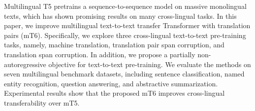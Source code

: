 Multilingual T5 pretrains a sequence-to-sequence model on massive monolingual texts, which has shown promising results on many cross-lingual tasks. In this paper, we improve multilingual text-to-text transfer Transformer with translation pairs (mT6). Specifically, we explore three cross-lingual text-to-text pre-training tasks, namely, machine translation, translation pair span corruption, and translation span corruption. In addition, we propose a partially non-autoregressive objective for text-to-text pre-training. We evaluate the methods on seven multilingual benchmark datasets, including sentence classification, named entity recognition, question answering, and abstractive summarization. Experimental results show that the proposed mT6 improves cross-lingual transferability over mT5.
